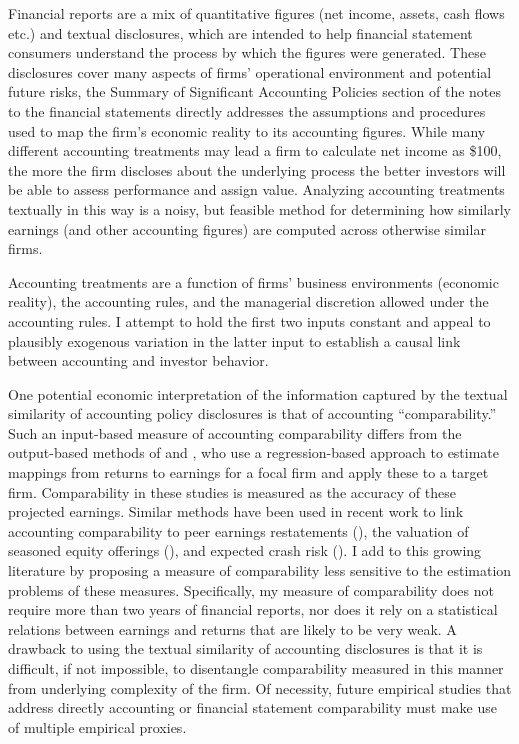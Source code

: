 \documentclass[thesis]{thesis-umich}
\begin{document}
Financial reports are a mix of quantitative figures (net income, assets, cash flows etc.) and textual disclosures, which are intended to help financial statement consumers understand the process by which the figures were generated. These disclosures cover many aspects of firms' operational environment and potential future risks, the Summary of Significant Accounting Policies section of the notes to the financial statements directly addresses the assumptions and procedures used to map the firm's economic reality to its accounting figures. While many different accounting treatments may lead a firm to calculate net income as \$100, the more the firm discloses about the underlying process the better investors will be able to assess performance and assign value. Analyzing accounting treatments textually in this way is a noisy, but feasible method for determining how similarly earnings (and other accounting figures) are computed across otherwise similar firms.

Accounting treatments are a function of firms' business environments (economic reality), the accounting rules, and the managerial discretion allowed under the accounting rules. I attempt to hold the first two inputs constant and appeal to plausibly exogenous variation in the latter input to establish a causal link between accounting and investor behavior.

One potential economic interpretation of the information captured by the textual similarity of accounting policy disclosures is that of accounting ``comparability.'' Such an input-based measure of accounting comparability differs from the output-based methods of \cite{bhojrajlee2002} and \cite{defrancoetal2011}, who use a regression-based approach to estimate mappings from returns to earnings for a focal firm and apply these to a target firm. Comparability in these studies is measured as the accuracy of these projected earnings. Similar methods have been used in recent work to link accounting comparability to peer earnings restatements (\cite{campbellyeung2016}), the valuation of seasoned equity offerings (\cite{shaneetal2014}), and expected crash risk (\cite{kimetal2016}). I add to this growing literature by proposing a measure of comparability less sensitive to the estimation problems of these measures. Specifically, my measure of comparability does not require more than two years of financial reports, nor does it rely on a statistical relations between earnings and returns that  are likely to be very weak. A drawback to using the textual similarity of accounting disclosures is that it is difficult, if not impossible, to disentangle comparability measured in this manner from underlying complexity of the firm. Of necessity, future empirical studies that address directly accounting or financial statement comparability must make use of multiple empirical proxies.
\end{document}
